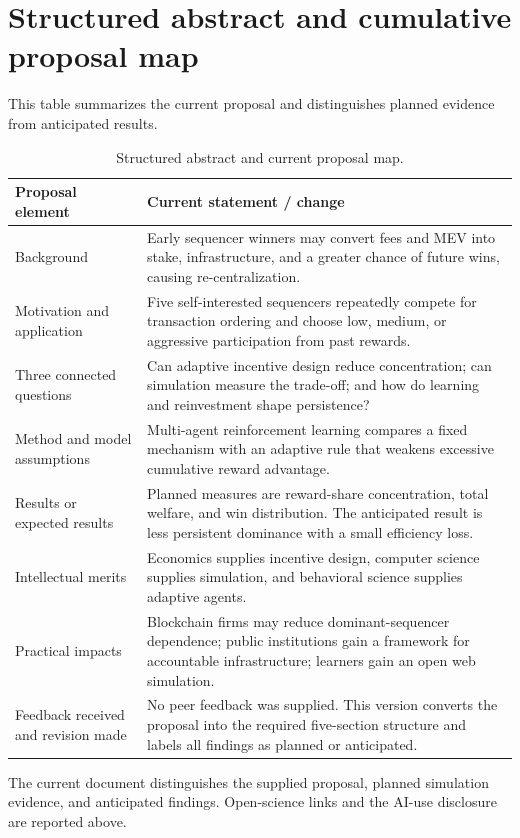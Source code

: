 \section{Structured abstract and cumulative proposal map}\label{app:abstract}
This table summarizes the current proposal and distinguishes planned evidence from anticipated results.
\par\medskip
\begin{table}[H]
\caption{Structured abstract and current proposal map.}
\label{tab:abstract-map}
\renewcommand{\arraystretch}{1.18}
\begin{tabularx}{\textwidth}{@{}p{}Y@{}}
\toprule
\textbf{Proposal element} & \textbf{Current statement / change} \\
\midrule
Background & Early sequencer winners may convert fees and MEV into stake, infrastructure, and a greater chance of future wins, causing re-centralization. \\
Motivation and application & Five self-interested sequencers repeatedly compete for transaction ordering and choose low, medium, or aggressive participation from past rewards. \\
Three connected questions & Can adaptive incentive design reduce concentration; can simulation measure the trade-off; and how do learning and reinvestment shape persistence? \\
Method and model assumptions & Multi-agent reinforcement learning compares a fixed mechanism with an adaptive rule that weakens excessive cumulative reward advantage. \\
Results or expected results & Planned measures are reward-share concentration, total welfare, and win distribution. The anticipated result is less persistent dominance with a small efficiency loss. \\
Intellectual merits & Economics supplies incentive design, computer science supplies simulation, and behavioral science supplies adaptive agents. \\
Practical impacts & Blockchain firms may reduce dominant-sequencer dependence; public institutions gain a framework for accountable infrastructure; learners gain an open web simulation. \\
Feedback received and revision made & No peer feedback was supplied. This version converts the proposal into the required five-section structure and labels all findings as planned or anticipated. \\
\bottomrule
\end{tabularx}
\end{table}
\noindent The current document distinguishes the supplied proposal, planned simulation evidence, and anticipated findings. Open-science links and the AI-use disclosure are reported above.

